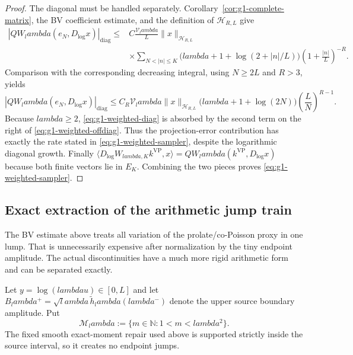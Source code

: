 \documentclass[11pt]{article}
\def\lambda{lambda}%
\theoremstyle{remark}
\begin{document}
\begin{proof}
The diagonal must be handled separately.  Corollary~\ref{cor:g1-complete-matrix},
the BV coefficient estimate, and the definition of $\mathcal H_{R,L}$ give
\[
 \begin{split}
 |QW_\lambda(e_N,D_{\log}x)|_{\mathrm{diag}}
 \le{}& C\frac{\mathcal V_\lambda}{L}
 \|x\|_{\mathcal H_{R,L}}\\
 &\times\sum_{N<|n|\le K}
 \bigl(\lambda+1+\log(2+|n|/L)\bigr)
 \left(1+\frac{|n|}{L}\right)^{-R}.
 \end{split}
\]
Comparison with the corresponding decreasing integral, using $N\ge2L$ and
$R>3$, yields
\begin{equation}\label{eq:g1-weighted-diag}
 |QW_\lambda(e_N,D_{\log}x)|_{\mathrm{diag}}
 \le C_R\mathcal V_\lambda\|x\|_{\mathcal H_{R,L}}
 \bigl(\lambda+1+\log(2N)\bigr)
 \left(\frac{L}{N}\right)^{R-1}.
\end{equation}
Because $\lambda\ge2$, \eqref{eq:g1-weighted-diag} is absorbed by the
second term on the right of \eqref{eq:g1-weighted-offdiag}.  Thus the
projection-error contribution has exactly the rate stated in
\eqref{eq:g1-weighted-sampler}, despite the logarithmic diagonal growth.
Finally
$\langle D_{\log}W_{\lambda,K}k^{\mathrm{VP}},x\rangle
=QW_\lambda(k^{\mathrm{VP}},D_{\log}x)$ because both finite vectors lie in
$E_K$.  Combining the two pieces proves \eqref{eq:g1-weighted-sampler}.
\end{proof}

\subsection{Exact extraction of the arithmetic jump train}
The BV estimate above treats all variation of the prolate/co-Poisson proxy in
one lump.  That is unnecessarily expensive after normalization by the tiny
endpoint amplitude.  The actual discontinuities have a much more rigid
arithmetic form and can be separated exactly.

Let $y=\log(\lambda u)\in[0,L]$ and let $B_\lambda^{+}
=\sqrt\lambda\,\widetilde h_\lambda(\lambda^-)$ denote the upper source
boundary amplitude.  Put
\[
 \mathcal M_\lambda:=\{m\in\mathbb N:1<m<\lambda^2\}.
\]
The fixed smooth exact-moment repair used above is supported strictly inside
the source interval, so it creates no endpoint jumps.
\end{document}
